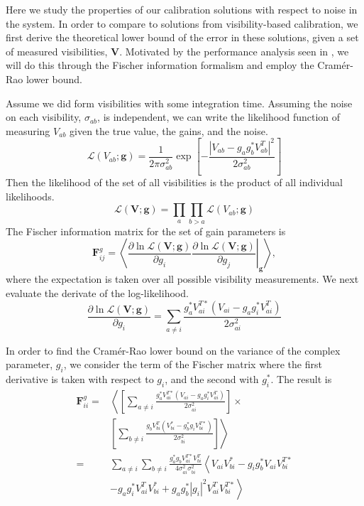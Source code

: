\documentclass[a4paper,fleqn,usenatbib]{../mnras}
\begin{document}
Here we study the properties of our calibration solutions with respect to noise in the system. In order to compare to solutions from visibility-based calibration, we first derive the theoretical lower bound of the error in these solutions, given a set of measured visibilities, $\mathbf{V}$. Motivated by the performance analysis seen in \cite{kaz13}, we will do this through the Fischer information formalism and employ the Cram\'er-Rao lower bound. 

Assume we did form visibilities with some integration time. Assuming the noise on each visibility, $\sigma_{ab}$, is independent, we can write the likelihood function of measuring $V_{ab}$ given the true value, the gains, and the noise.
\begin{equation}
\mathcal{L}(V_{ab};\mathbf{g}) = \frac{1}{2\pi \sigma_{ab}^2}\exp\left[-\frac{\left|V_{ab} - g_a g_b^* V_{ab}^T\right|^2}{2\sigma_{ab}^2}\right]
\end{equation}
Then the likelihood of the set of all visibilities is the product of all individual likelihoods.
\begin{equation}
\mathcal{L}(\mathbf{V};\mathbf{g}) = \prod_a \prod_{b > a} \mathcal{L}(V_{ab};\mathbf{g})
\end{equation}
The Fischer information matrix for the set of gain parameters is
\begin{equation}
\mathbf{F}^g_{ij} = \left<\left. \frac{\partial \ln \mathcal{L}(\mathbf{V};\mathbf{g})}{\partial g_i} \frac{\partial \ln \mathcal{L}(\mathbf{V};\mathbf{g})}{\partial g_j}\right|_\mathbf{g}\right>,
\end{equation}
where the expectation is taken over all possible visibility measurements.
We next evaluate the derivate of the log-likelihood.
\begin{equation}
\frac{\partial \ln \mathcal{L}(\mathbf{V};\mathbf{g})}{\partial g_i} = 
\sum_{a \ne i} \frac{g_a^* V_{ai}^{T*} (V_{ai} - g_a g_i^* V_{ai}^T)}{2 \sigma_{ai}^2}
\end{equation}

In order to find the Cram\'er-Rao lower bound on the variance of the complex parameter, $g_i$, we consider the term of the Fischer matrix where the first derivative is taken with respect to $g_i$, and the second with $g_i^*$. The result is
\begin{align}
\mathbf{F}^g_{ii} = & \left<\left[ \sum_{a \ne i} \frac{g_a^* V_{ai}^{T*} (V_{ai} - g_a g_i^* V_{ai}^T)}{2 \sigma_{ai}^2} \right] \right. \times \nonumber \\
& \left. \left[ \sum_{b \ne i} \frac{g_b V_{bi}^{T} (V_{bi}^* - g_b^* g_i V_{bi}^{T*})}{2 \sigma_{bi}^2} \right] \right> \nonumber \\
= &\sum_{a\ne i} \sum_{b \ne i} \frac{g_a^* g_b V_{ai}^{T*} V_{bi}^T}{4 \sigma_{ai}^2 \sigma_{bi}^2} \left< V_{ai}V_{bi}^* - g_i g_b^* V_{ai}V_{bi}^{T*}\nonumber \right.\\
&\left. - g_a g_i^* V_{ai}^T V_{bi}^* + g_a g_b^* |g_i|^2 V_{ai}^T V_{bi}^{T*}\right>
\label{eq:Fischer_before_expect}
\end{align}
\end{document}
